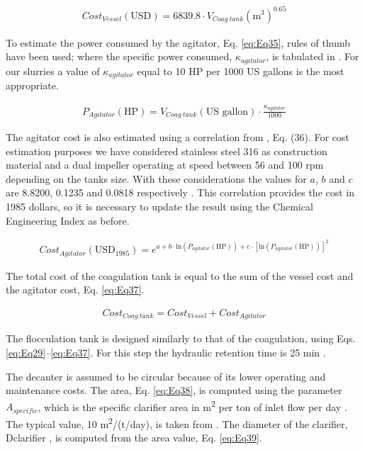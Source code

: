 \begin{refsection}[referencesCh2]
\begin{align}
	{Cost}_{Vessel} \left( \text{USD} \right) = 6839.8 \cdot {V}_{Coag \ tank}{\left( {\text{m}^{3}} \right)^{0.65}} \label{eq:Eq34}
\end{align}

To estimate the power consumed by the agitator, Eq. \ref{eq:Eq35}, rules of thumb have been used; where the specific power consumed, $\kappa_{agitator}$, is tabulated in \citet{walas1988chemical}. For our slurries a value of $\kappa_{agitator}$ equal to 10 HP per 1000 US gallons is the most appropriate.

\begin{align}
	P_{Agitator}\left( \text{HP} \right) = V_{Coag \ tank} \left( {\text{US gallon}} \right) \cdot \frac{\kappa_{agitator}}{1000} \label{eq:Eq35}
\end{align}

The agitator cost is also estimated using a correlation from \citet{walas1988chemical}, Eq. (36). For cost estimation purposes we have considered stainless steel 316 as construction material and a dual impeller operating at speed between 56 and 100 rpm depending on the tanks size. With these considerations the values for $a$, $b$ and $c$ are 8.8200, 0.1235 and 0.0818 respectively \citep{walas1988chemical}. This correlation provides the cost in 1985 dollars, so it is necessary to update the result using the Chemical Engineering Index as before.

\begin{align}
	Cost_{Agitator} \left( \text{USD}_{1985}  \right) = {e^{a + b \cdot {\text{ln}}\left( {{P_{agitator}}\left( \text{HP} \right)} \right) + c \cdot {\left[ \text{ln}\left( {P_{agitator}\left( \text{HP} \right)} \right) \right] }^2}} \label{eq:Eq36}
\end{align}

The total cost of the coagulation tank is equal to the sum of the vessel cost and the agitator cost, Eq. \ref{eq:Eq37}.

\begin{align}
	{Cost}_{Coag \ tank} = Cost_{Vessel} + Cost_{Agitator} \label{eq:Eq37}
\end{align}

The flocculation tank is designed similarly to that of the coagulation, using Eqs. \ref{eq:Eq29}–\ref{eq:Eq37}. For this step the hydraulic retention time is 25 min \citep{zhou2008enhanced}.

The decanter is assumed to be circular because of its lower operating and maintenance costs. The area, Eq. \ref{eq:Eq38}, is computed using the parameter $A_{specific}$, which is the specific clarifier area in m\textsuperscript{2} per ton of inlet flow per day \citep{wef2005wef}. The typical value, 10 m\textsuperscript{2}/(t/day), is taken from \citet{green2008perry}. The diameter of the clarifier, Dclarifier , is computed from the area value, Eq. \ref{eq:Eq39}.


\end{refsection}
